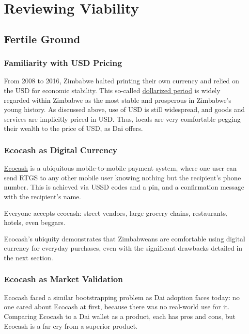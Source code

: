 \documentclass{article}
\begin{document}
\newpage
\section{Reviewing Viability} \label{viability}

\subsection{Fertile Ground} \label{fertile}

\subsubsection{Familiarity with USD Pricing} \label{familiar with usd}

From 2008 to 2016, Zimbabwe halted printing their own currency and relied on the USD for economic stability. This so-called \href{https://www.voanews.com/africa/zimbabwe-ends-decade-dollarization-new-currency-reform}{dollarized period} is widely regarded within Zimbabwe as the most stable and prosperous in Zimbabwe's young history. As discussed above, use of USD is still widespread, and goods and services are implicitly priced in USD. Thus, locals are very comfortable pegging their wealth to the price of USD, as Dai offers.

\subsubsection{Ecocash as Digital Currency} \label{ecocash digital}

\href{https://en.wikipedia.org/wiki/EcoCash}{Ecocash} is a ubiquitous mobile-to-mobile payment system, where one user can send RTGS to any other mobile user knowing nothing but the recipient's phone number. This is achieved via USSD codes and a pin, and a confirmation message with the recipient's name.

Everyone accepts ecocash: street vendors, large grocery chains, restaurants, hotels, even beggars.

Ecocash's ubiquity demonstrates that Zimbabweans are comfortable using digital currency for everyday purchases, even with the significant drawbacks detailed in the next section.

\subsubsection{Ecocash as Market Validation} \label{ecocash market}

Ecocash faced a similar bootstrapping problem as Dai adoption faces today: no one cared about Ecocash at first, because there was no real-world use for it. Comparing Ecocash to a Dai wallet as a product, each has pros and cons, but Ecocash is a far cry from a superior product.
\end{document}
